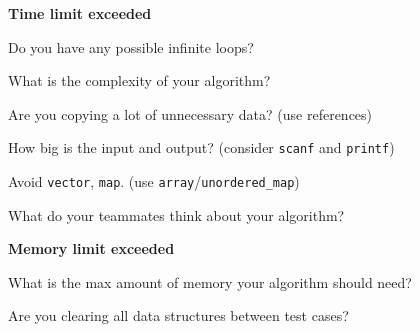 \documentclass[a4paper]{article}
\begin{document}
\noindent
\textbf{Time limit exceeded}

\noindent
Do you have any possible infinite loops?

\noindent
What is the complexity of your algorithm?

\noindent
Are you copying a lot of unnecessary data? (use references)

\noindent
How big is the input and output? (consider \texttt{scanf} and \texttt{printf})

\noindent
Avoid \texttt{vector}, \texttt{map}. (use \texttt{array}/\texttt{unordered\_map})

\noindent
What do your teammates think about your algorithm?

\noindent
\textbf{Memory limit exceeded}

\noindent
What is the max amount of memory your algorithm should need?

\noindent
Are you clearing all data structures between test cases?
\end{document}

